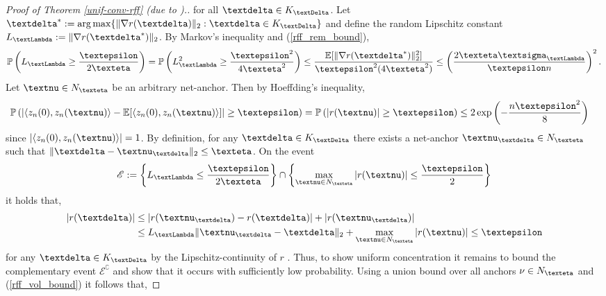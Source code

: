 \documentclass[openany]{book}
\begin{document}
\begin{proof}[Proof of Theorem \ref{unif-conv-rff} (due to \cite{rahimi2007}).]
    for all $\gdelta\in K_{\gDelta}$. Let $\gdelta^\ast:=\argmax\{\|\nabla r(\gdelta)\|_2:\gdelta\in K_{\gDelta}\}$ and define the random Lipschitz constant $L_{\gLambda}:=\|\nabla r(\gdelta^\ast)\|_2$. By Markov's inequality and (\ref{rff_rem_bound}),
    \begin{equation*}
        \mathbb P\left(L_{\gLambda}\geq \frac{\gepsilon}{2\geta}\right)= \mathbb P\left(L_{\gLambda}^2\geq \frac{\gepsilon^2}{4\geta^2}\right)\leq  \frac{\mathbb E[\|\nabla r(\gdelta^\ast)\|_2^2]}{\gepsilon^2(4\geta^2)}\leq \left(\frac{2\geta\gsigma_{\gLambda}}{\gepsilon n}\right)^2.
    \end{equation*}
    Let $\gnu\in N_{\geta}$ be an arbitrary net-anchor. Then by Hoeffding's inequality, 
    \begin{equation*}
    \begin{split}
        \mathbb P\left(\vert \langle z_n(0),z_n(\gnu)\rangle - \mathbb E[\langle z_n(0),z_n(\gnu)\rangle]\vert \geq \gepsilon\right)&=\mathbb P\left(\vert r(\gnu)\vert \geq \gepsilon\right)\leq 2\exp\left(-\frac{n\gepsilon^2}{8}\right)
    \end{split}
    \end{equation*}
    since $\vert \langle z_n(0),z_n(\gnu)\rangle\vert = 1$.
    By definition, for any $\gdelta\in K_{\gDelta}$ there exists a net-anchor $\gnu_{\gdelta}\in N_{\geta}$ such that $\|\gdelta- \gnu_{\gdelta}\|_2\leq \geta$. On the event 
    \begin{equation*}
        \mathscr E:= \left\{L_{\gLambda}\leq \frac{\gepsilon}{2\geta}\right\}\cap \left\{\max_{\gnu \in N_{\geta}} \vert r(\gnu)\vert\leq \frac{\gepsilon}{2}\right\}
    \end{equation*}
    it holds that,
    \begin{equation*}
    \begin{split}
        \vert r(\gdelta)\vert &\leq \vert r(\gnu_{\gdelta})- r(\gdelta)\vert  + \vert  r(\gnu_{\gdelta})\vert
        \\ &\leq L_{\gLambda}\|\gnu_{\gdelta}-\gdelta\|_2 + \max_{\gnu \in N_{\geta}} \vert r(\gnu)\vert \leq \gepsilon
    \end{split}
    \end{equation*}
    for any $\gdelta \in K_{\gDelta}$ by the Lipschitz-continuity of $r$ . Thus, to show uniform concentration it remains to bound the complementary event $\mathscr E^\complement$ and show that it occurs with sufficiently low probability. Using a union bound over all anchors $\nu\in N_{\geta}$ and (\ref{rff_vol_bound}) it follows that,

\end{proof}
\end{document}
